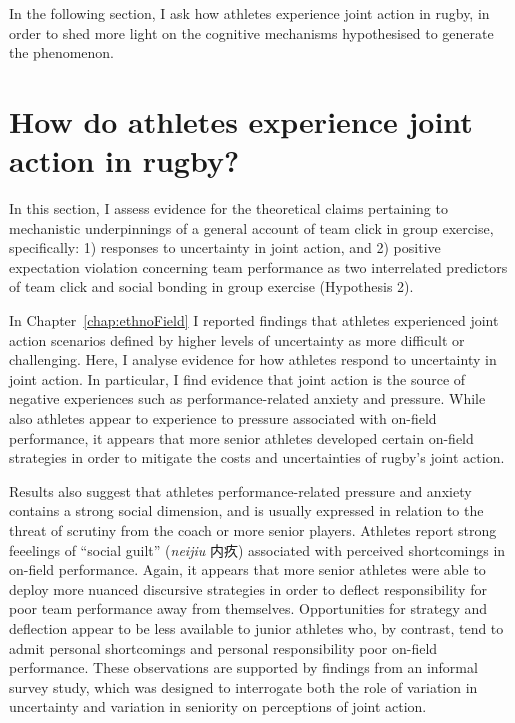 \begin{CJK}{UTF8}{gbsn}
In the following section, I ask how athletes experience joint action in rugby, in order to shed more light on the cognitive mechanisms hypothesised to generate the phenomenon.



























\section{How do athletes experience joint action in rugby?}
In this section, I assess evidence for the theoretical claims pertaining to mechanistic underpinnings of a general account of team click in group exercise, specifically: 1) responses to uncertainty in joint action, and 2) positive expectation violation concerning team performance as two interrelated predictors of team click and social bonding in group exercise (Hypothesis 2).

In Chapter~\ref{chap:ethnoField} I reported findings that athletes experienced joint action scenarios defined by higher levels of uncertainty as more difficult or challenging.  Here, I analyse evidence for how athletes respond to uncertainty in joint action.  In particular, I find evidence that joint action is the source of negative experiences such as performance-related anxiety and pressure.  While also athletes appear to experience to pressure associated with on-field performance, it appears that more senior athletes developed certain on-field strategies in order to mitigate the costs and uncertainties of rugby's joint action.

Results also suggest that athletes performance-related pressure and anxiety contains a strong social dimension, and is usually expressed in relation to the threat of scrutiny from the coach or more senior players.  Athletes report strong feeelings of ``social guilt'' (\textit{neijiu} 内疚) associated with perceived shortcomings in on-field performance.  Again, it appears that more senior athletes were able to deploy more nuanced discursive strategies in order to deflect responsibility for poor team performance away from themselves.  Opportunities for strategy and deflection appear to be less available to junior athletes who, by contrast, tend to admit personal shortcomings and personal responsibility poor on-field performance.  These observations are supported by findings from an informal survey study, which was designed to interrogate both the role of variation in uncertainty and variation in seniority on perceptions of joint action.


\end{CJK}

